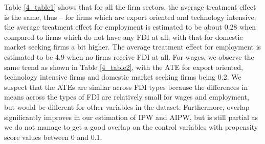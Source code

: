 



Table \ref{4_table1} shows that for all the firm sectors, the average treatment effect is the same, thus – for firms which are export oriented and technology intensive, the average treatment effect for employment is estimated to be about 0.28 when compared to firms which do not have any FDI at all, with that for domestic market seeking firms a bit higher. The average treatment effect for employment is estimated to be 4.9 when no firms receive FDI at all. For wages, we observe the same trend as shown in Table \ref{4_table2}, with the ATE for export oriented,  technology intensive firms and domestic market seeking firms being 0.2. We suspect that the ATEs are similar across FDI types because the differences in means across the types of FDI are relatively small for wages and employment, but would be different for other variables in the dataset. Furthermore, overlap significantly improves in our estimation of IPW and AIPW, but is still partial as we do not manage to get a good overlap on the control variables with propensity score values between 0 and 0.1.